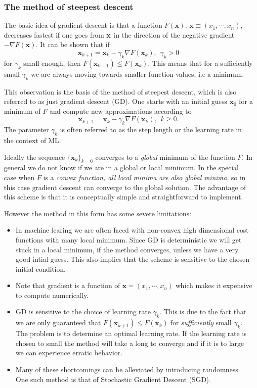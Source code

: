 \documentclass[a4paper, twocolumn]{article}
\begin{document}
\subsubsection{The method of steepest descent}
The basic idea of gradient descent is that a function $F(\mathbf{x})$, $ \mathbf{x} \equiv (x_1,\cdots,x_n)$, 
decreases fastest if one goes from $\bf {x}$ in the direction of the negative gradient $-\nabla F(\mathbf{x})$.
It can be shown that if 
\begin{equation}
\mathbf{x}_{k+1} = \mathbf{x}_k - \gamma_k \nabla F(\mathbf{x}_k), \ \ \gamma_k > 0
\end{equation}
for $\gamma_k$ small enough, then $F(\mathbf{x}_{k+1}) \leq F(\mathbf{x}_k)$. This means that for a sufficiently 
small $\gamma_k$ we are always moving towards smaller function values, i.e a minimum. 

This observation is the basis of the method of steepest descent, which is also referred to as just gradient descent (GD). 
One starts with an initial guess $\mathbf{x}_0$ for a minimum of $F$ and compute new approximations according to
\begin{equation}
\mathbf{x}_{k+1} = \mathbf{x}_k - \gamma_k \nabla F(\mathbf{x}_k), \ \ k \geq 0.
\end{equation}
The parameter $\gamma_k$ is often referred to as the step length or the learning rate in the context of ML.

Ideally the sequence $\{ \mathbf{x}_k \}_{k=0}$ converges to a \textit{global} minimum of the function $F$. 
In general we do not know if we are in a global or local minimum.  
In the special case when $F$ is a \textit{convex function, all local minima are also global minima}, so in this case gradient 
descent can converge to the global solution. The advantage of this scheme is that it is conceptually simple and 
straightforward to implement. 

However the method in this form has some severe limitations:

\begin{itemize}
 \item In machine learing we are often faced with non-convex high dimensional cost functions with many local minimum. 
 Since GD is deterministic we will get stuck in a local minimum, if the method converges, unless we have a very good intial 
 guess. This also implies that the scheme is sensitive to the chosen initial condition.
 \item Note that gradient is a function of $\mathbf{x} = (x_1,\cdots,x_n)$ which makes it expensive to compute numerically.
 \item GD is sensitive to the choice of learning rate $\gamma_k$. This is due to the fact that we are only guaranteed 
that $F(\mathbf{x}_{k+1}) \leq F(\mathbf{x}_k)$ for \textit{sufficiently} small $\gamma_k$. The problem is to determine an 
optimal learning rate. If the learning rate is chosen to small the method will take a long to converge and if it is to 
large we can experience erratic behavior.
\item Many of these shortcomings can be alleviated by introducing randomness. One such method is that of Stochastic Gradient Descent 
(SGD).
\end{itemize}
\end{document}
